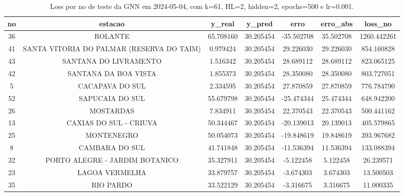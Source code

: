 \begin{table}[h]
\centering
\caption{Loss por no de teste da GNN em 2024-05-04, com k=61, HL=2, hidden=2, epochs=500 e lr=0.001.}
\label{tab:gnn_loss_k61_hl2_h2_e500_d20240504}
\begin{tabular}{ccccccc}
\toprule
no & estacao & y\_real & y\_pred & erro & erro\_abs & loss\_no \\
\midrule
36 & ROLANTE & 65.708160 & 30.205454 & -35.502708 & 35.502708 & 1260.442261 \\
41 & SANTA VITORIA DO PALMAR (RESERVA DO TAIM) & 0.979424 & 30.205454 & 29.226030 & 29.226030 & 854.160828 \\
43 & SANTANA DO LIVRAMENTO & 1.516342 & 30.205454 & 28.689112 & 28.689112 & 823.065125 \\
42 & SANTANA DA BOA VISTA & 1.855373 & 30.205454 & 28.350080 & 28.350080 & 803.727051 \\
5 & CACAPAVA DO SUL & 2.334595 & 30.205454 & 27.870859 & 27.870859 & 776.784790 \\
52 & SAPUCAIA DO SUL & 55.679798 & 30.205454 & -25.474344 & 25.474344 & 648.942200 \\
26 & MOSTARDAS & 7.834911 & 30.205454 & 22.370543 & 22.370543 & 500.441162 \\
13 & CAXIAS DO SUL - CRIUVA & 50.344467 & 30.205454 & -20.139013 & 20.139013 & 405.579865 \\
25 & MONTENEGRO & 50.054073 & 30.205454 & -19.848619 & 19.848619 & 393.967682 \\
8 & CAMBARA DO SUL & 41.741848 & 30.205454 & -11.536394 & 11.536394 & 133.088394 \\
32 & PORTO ALEGRE - JARDIM BOTANICO & 35.327911 & 30.205454 & -5.122458 & 5.122458 & 26.239571 \\
23 & LAGOA VERMELHA & 33.879757 & 30.205454 & -3.674303 & 3.674303 & 13.500503 \\
35 & RIO PARDO & 33.522129 & 30.205454 & -3.316675 & 3.316675 & 11.000335 \\
\bottomrule
\end{tabular}
\end{table}
